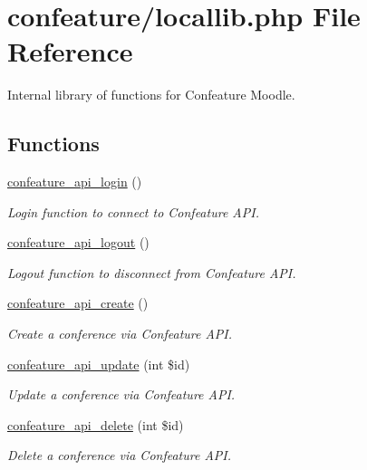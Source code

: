 \hypertarget{locallib_8php}{\section{confeature/locallib.php File Reference}
\label{locallib_8php}
}


Internal library of functions for Confeature Moodle.  


\subsection*{Functions}
\begin{DoxyCompactItemize}
\item 
\hyperlink{locallib_8php_a0034931acefd021a0147a0216bc0a6a8}{confeature\-\_\-api\-\_\-login} ()
\begin{DoxyCompactList}\small\item\em Login function to connect to Confeature A\-P\-I. \end{DoxyCompactList}\item 
\hyperlink{locallib_8php_a7acfa5bd6b3fa64681a044cfa5360652}{confeature\-\_\-api\-\_\-logout} ()
\begin{DoxyCompactList}\small\item\em Logout function to disconnect from Confeature A\-P\-I. \end{DoxyCompactList}\item 
\hyperlink{locallib_8php_a7dc79dc02ce145c489edd4734a207278}{confeature\-\_\-api\-\_\-create} ()
\begin{DoxyCompactList}\small\item\em Create a conference via Confeature A\-P\-I. \end{DoxyCompactList}\item 
\hyperlink{locallib_8php_a64452cfcadb12a7da4c87cdcb94ea6a4}{confeature\-\_\-api\-\_\-update} (int \$id)
\begin{DoxyCompactList}\small\item\em Update a conference via Confeature A\-P\-I. \end{DoxyCompactList}\item 
\hyperlink{locallib_8php_a2771af186ff1cbf0e13dff93e959f0c2}{confeature\-\_\-api\-\_\-delete} (int \$id)
\begin{DoxyCompactList}\small\item\em Delete a conference via Confeature A\-P\-I. \end{DoxyCompactList}\end{DoxyCompactItemize}
